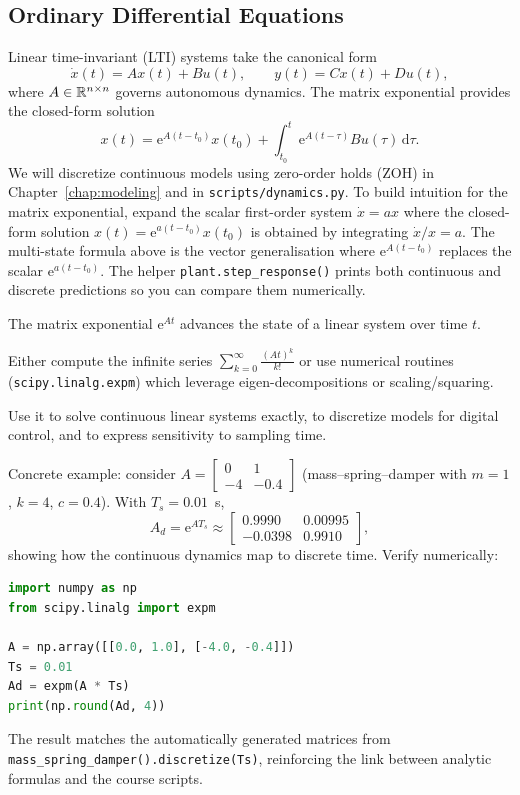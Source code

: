 \subsection{Ordinary Differential Equations}
Linear time-invariant (LTI) systems take the canonical form
\begin{equation}
    \dot{x}(t) = A x(t) + B u(t), \qquad y(t) = C x(t) + D u(t),
\end{equation}
where $A \in \mathbb{R}^{n \times n}$ governs autonomous dynamics. The matrix exponential provides the closed-form solution
\begin{equation}
    x(t) = \mathrm{e}^{A(t - t_0)} x(t_0) + \int_{t_0}^{t} \mathrm{e}^{A(t - \tau)} B u(\tau)\, \mathrm{d}\tau.
\end{equation}
We will discretize continuous models using zero-order holds (ZOH) in Chapter~\ref{chap:modeling} and in \texttt{scripts/dynamics.py}.
To build intuition for the matrix exponential, expand the scalar first-order system $\dot{x} = a x$ where the closed-form solution $x(t) = \mathrm{e}^{a(t - t_0)} x(t_0)$ is obtained by integrating $\dot{x}/x = a$. The multi-state formula above is the vector generalisation where $\mathrm{e}^{A(t - t_0)}$ replaces the scalar $\mathrm{e}^{a(t - t_0)}$. The helper \texttt{plant.step\_response()} prints both continuous and discrete predictions so you can compare them numerically.
\begin{description}[leftmargin=2.5em, style=nextline]
    \item[\textbf{What?}] The matrix exponential $\mathrm{e}^{A t}$ advances the state of a linear system over time $t$.
    \item[\textbf{How?}] Either compute the infinite series $\sum_{k=0}^{\infty} \frac{(A t)^k}{k!}$ or use numerical routines (\texttt{scipy.linalg.expm}) which leverage eigen-decompositions or scaling/squaring.
    \item[\textbf{When?}] Use it to solve continuous linear systems exactly, to discretize models for digital control, and to express sensitivity to sampling time.
\end{description}
Concrete example: consider $A = \begin{bmatrix}0 & 1 \\ -4 & -0.4\end{bmatrix}$ (mass--spring--damper with $m=1$, $k=4$, $c=0.4$). With $T_s = 0.01$~s,
\[
    A_d = \mathrm{e}^{A T_s} \approx
    \begin{bmatrix}
        0.9990 & 0.00995 \\
        -0.0398 & 0.9910
    \end{bmatrix},
\]
showing how the continuous dynamics map to discrete time. Verify numerically:
\begin{lstlisting}[language=python]
import numpy as np
from scipy.linalg import expm

A = np.array([[0.0, 1.0], [-4.0, -0.4]])
Ts = 0.01
Ad = expm(A * Ts)
print(np.round(Ad, 4))
\end{lstlisting}
The result matches the automatically generated matrices from \texttt{mass\_spring\_damper().discretize(Ts)}, reinforcing the link between analytic formulas and the course scripts.


